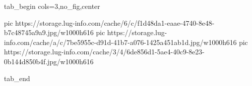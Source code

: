  
 
 
 
 


\ifcmt
  tab_begin cols=3,no_fig,center

     pic https://storage.lug-info.com/cache/6/c/f1d48da1-eaae-4740-8e48-b7c48745a9a9.jpg/w1000h616%
		 pic https://storage.lug-info.com/cache/a/c/7be5955c-d91d-41b7-a076-1425a451ab1d.jpg/w1000h616%
		 pic https://storage.lug-info.com/cache/3/4/6de856d1-5ae4-40c9-8e23-0b144d850b4f.jpg/w1000h616%

  tab_end
\fi
